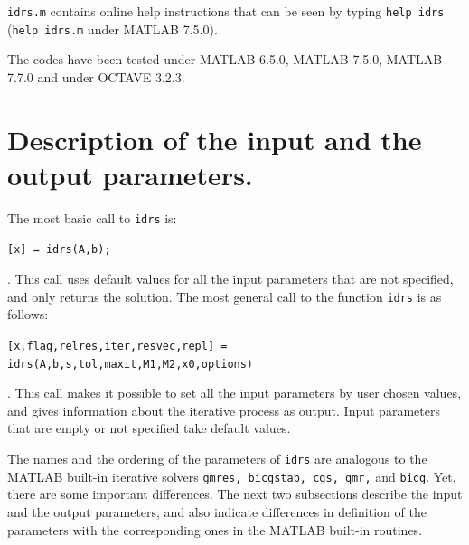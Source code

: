 \documentclass[prodmode,acmtoms]{acmsmall}
\begin{document}
{\tt idrs.m} contains online help instructions that can be seen
by typing {\tt help idrs} ({\tt help idrs.m} under MATLAB 7.5.0).

The codes have been tested under MATLAB 6.5.0, MATLAB 7.5.0, MATLAB 7.7.0 and under OCTAVE 3.2.3.

\section{Description of the input and the output parameters.}
The most basic call to {\tt idrs} is:\newline
\centerline{\tt [x] = idrs(A,b);}.\newline
This call uses default values for all the input parameters that are not specified, and only returns the solution.
The most general call to the function {\tt idrs} is as follows:\newline
\centerline{\tt [x,flag,relres,iter,resvec,repl] = idrs(A,b,s,tol,maxit,M1,M2,x0,options)}.\newline
This call makes it possible to set all the input parameters by user chosen values, and gives information about the iterative
process as output. Input parameters that are empty or not specified take default values.

The names and the ordering of the parameters of {\tt idrs} are analogous to the MATLAB built-in
iterative solvers {\tt gmres, bicgstab, cgs, qmr,} and {\tt bicg}. Yet, there are some important differences. The
next two subsections describe the input and the output parameters, and also indicate differences in definition of
the parameters with the corresponding ones in the MATLAB built-in routines.
\end{document}
